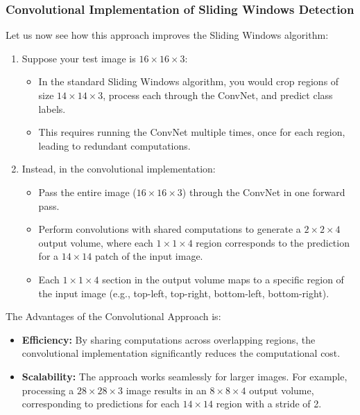 \documentclass[letterpaper,12pt,notitlepage,twoside]{report}
\begin{document}
\subsubsection*{Convolutional Implementation of Sliding Windows Detection}

Let us now see how this approach improves the Sliding Windows algorithm:
\begin{enumerate}
    \item Suppose your test image is $16 \times 16 \times 3$:
    \begin{itemize}
        \item In the standard Sliding Windows algorithm, you would crop regions of size $14 \times 14 \times 3$, process each through the ConvNet, and predict class labels.
        \item This requires running the ConvNet multiple times, once for each region, leading to redundant computations.
    \end{itemize}
    \item Instead, in the convolutional implementation:
    \begin{itemize}
        \item Pass the entire image ($16 \times 16 \times 3$) through the ConvNet in one forward pass.
        \item Perform convolutions with shared computations to generate a $2 \times 2 \times 4$ output volume, where each $1 \times 1 \times 4$ region corresponds to the prediction for a $14 \times 14$ patch of the input image.
        \item Each $1 \times 1 \times 4$ section in the output volume maps to a specific region of the input image (e.g., top-left, top-right, bottom-left, bottom-right).
    \end{itemize}
\end{enumerate}

The Advantages of the Convolutional Approach is:
\begin{itemize}
    \item \textbf{Efficiency:} By sharing computations across overlapping regions, the convolutional implementation significantly reduces the computational cost.
    \item \textbf{Scalability:} The approach works seamlessly for larger images. For example, processing a $28 \times 28 \times 3$ image results in an $8 \times 8 \times 4$ output volume, corresponding to predictions for each $14 \times 14$ region with a stride of 2.
\end{itemize}
\end{document}
